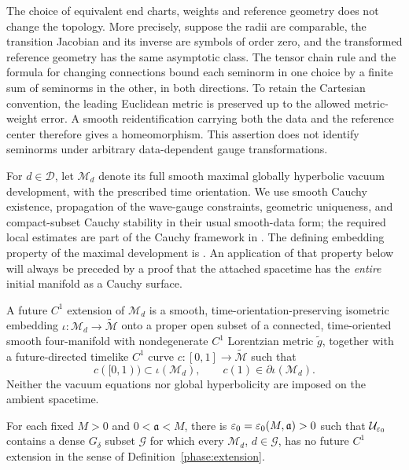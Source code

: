 The choice of equivalent end charts, weights and reference geometry
does not change the topology. More precisely, suppose the radii are
comparable, the transition Jacobian and its inverse are symbols of
order zero, and the transformed reference geometry has the same
asymptotic class. The tensor chain rule and the formula for changing
connections bound each seminorm in one choice by a finite sum of
seminorms in the other, in both directions. To retain the Cartesian
convention, the leading Euclidean metric is preserved up to the
allowed metric-weight error. A smooth reidentification carrying both
the data and the reference center therefore gives a homeomorphism.
This assertion does not identify seminorms under arbitrary
data-dependent gauge transformations.

For \(d\in\mathcal D\), let \(\mathcal M_d\) denote its full smooth
maximal globally hyperbolic vacuum development, with the prescribed
time orientation. We use smooth Cauchy existence, propagation of the
wave-gauge constraints, geometric uniqueness, and compact-subset
Cauchy stability in their usual smooth-data form; the required local
estimates are part of the Cauchy framework in
\cite[]{Foundation}.
The defining embedding property of the maximal development is
\cite[Definitions 2.1--2.2 and Theorems 2.6--2.8]{Sbierski2016}.
An application of that property below will always be preceded by a
proof that the attached spacetime has the \emph{entire} initial
manifold as a Cauchy surface.

\begin{definition}
\label{phase:extension}
A future \(C^1\) extension of \(\mathcal M_d\) is a smooth,
time-orientation-preserving isometric embedding
\(\iota:\mathcal M_d\longrightarrow\widetilde{\mathcal M}\)
onto a proper open subset of a connected, time-oriented smooth
four-manifold with nondegenerate \(C^1\) Lorentzian metric
\(\widetilde g\), together with a future-directed timelike \(C^1\)
curve \(c:[0,1]\to\widetilde{\mathcal M}\) such that
\[
 c([0,1))\subset\iota(\mathcal M_d),\qquad
 c(1)\in\partial\iota(\mathcal M_d).
\]
Neither the vacuum equations nor global hyperbolicity are imposed
on the ambient spacetime.
\end{definition}

\begin{theorem}
\label{phase:main}
For each fixed \(M>0\) and \(0<\mathfrak a<M\), there is
\(\varepsilon_0=\varepsilon_0(M,\mathfrak a)>0\) such that
\(\mathcal U_{\varepsilon_0}\) contains a dense \(G_\delta\) subset
\(\mathcal G\) for which every \(\mathcal M_d\), \(d\in\mathcal G\),
has no future \(C^1\) extension in the sense of
Definition~\ref{phase:extension}.
\end{theorem}

